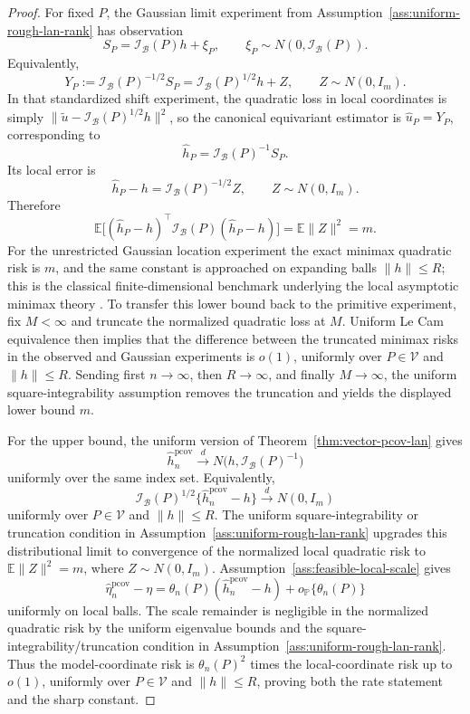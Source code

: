 \documentclass[11pt,a4paper]{amsart}
\theoremstyle{plain}
\theoremstyle{definition}
\theoremstyle{remark}
\newcommand{\PP}{\mathbb{P}}
\newcommand{\EE}{\mathbb{E}}
\newcommand{\toD}{\xrightarrow{d}}
\newcommand{\scrB}{\mathcal{B}}
\newcommand{\scrI}{\mathcal{I}}
\begin{document}
\begin{proof}
For fixed \(P\), the Gaussian limit experiment from
Assumption~\ref{ass:uniform-rough-lan-rank} has observation
\[
        S_P=\scrI_{\scrB}(P)h+\xi_P,
        \qquad \xi_P\sim N(0,\scrI_{\scrB}(P)).
\]
Equivalently,
\[
        Y_P:=\scrI_{\scrB}(P)^{-1/2}S_P=\scrI_{\scrB}(P)^{1/2}h+Z,
        \qquad Z\sim N(0,I_m).
\]
In that standardized shift experiment, the quadratic loss in local coordinates is simply
\(\| \widetilde u-\scrI_{\scrB}(P)^{1/2}h\|^2\), so the canonical equivariant estimator is
\(\widehat u_P=Y_P\), corresponding to
\[
        \widehat h_P=\scrI_{\scrB}(P)^{-1}S_P.
\]
Its local error is
\[
        \widehat h_P-h
        =
        \scrI_{\scrB}(P)^{-1/2}Z,
        \qquad Z\sim N(0,I_m).
\]
Therefore
\[
        \EE\bigl[
        (\widehat h_P-h)^\top
        \scrI_{\scrB}(P)
        (\widehat h_P-h)
        \bigr]
        =
        \EE\|Z\|^2=m.
\]
For the unrestricted Gaussian location experiment the exact minimax quadratic risk is \(m\), and
the same constant is approached on expanding balls \(\|h\|\le R\); this is the classical
finite-dimensional benchmark underlying the local asymptotic minimax theory
\cite[Chapter~8]{vandervaart1998}.  To transfer this lower bound back to the primitive experiment,
fix \(M<\infty\) and truncate the normalized quadratic loss at \(M\).  Uniform Le Cam equivalence
then implies that the difference between the truncated minimax risks in the observed and Gaussian
experiments is \(o(1)\), uniformly over \(P\in\mathcal V\) and \(\|h\|\le R\).  Sending first
\(n\to\infty\), then \(R\to\infty\), and finally \(M\to\infty\), the uniform square-integrability
assumption removes the truncation and yields the displayed lower bound \(m\).

For the upper bound, the uniform version of Theorem~\ref{thm:vector-pcov-lan} gives
\[
        \widehat h_n^{\mathrm{pcov}}
        \toD
        N\bigl(h,\scrI_{\scrB}(P)^{-1}\bigr)
\]
uniformly over the same index set.  Equivalently,
\[
        \scrI_{\scrB}(P)^{1/2}\{\widehat h_n^{\mathrm{pcov}}-h\}
        \toD
        N(0,I_m)
\]
uniformly over \(P\in\mathcal V\) and \(\|h\|\le R\).  The uniform square-integrability or
truncation condition in Assumption~\ref{ass:uniform-rough-lan-rank} upgrades this distributional
limit to convergence of the normalized local quadratic risk to \(\EE\|Z\|^2=m\), where
\(Z\sim N(0,I_m)\).  Assumption~\ref{ass:feasible-local-scale} gives
\[
        \widehat\eta_n^{\mathrm{pcov}}-\eta
        =
        \theta_n(P)(\widehat h_n^{\mathrm{pcov}}-h)
        +
        o_{\PP}\{\theta_n(P)\}
\]
uniformly on local balls.  The scale remainder is negligible in the normalized quadratic risk by
the uniform eigenvalue bounds and the square-integrability/truncation condition in
Assumption~\ref{ass:uniform-rough-lan-rank}.  Thus the model-coordinate risk is
\(\theta_n(P)^2\) times the local-coordinate risk up to \(o(1)\), uniformly over
\(P\in\mathcal V\) and \(\|h\|\le R\), proving both the rate statement and the sharp constant.
\end{proof}
\end{document}
